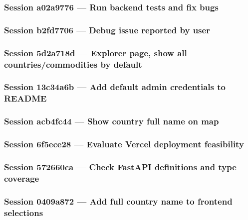 \subsubsection*{Session a02a9776 — Run backend tests and fix bugs}


\subsubsection*{Session b2fd7706 — Debug issue reported by user}


\subsubsection*{Session 5d2a718d — Explorer page, show all countries/commodities by default}


\subsubsection*{Session 13c34a6b — Add default admin credentials to README}


\subsubsection*{Session acb4fc44 — Show country full name on map}


\subsubsection*{Session 6f5ece28 — Evaluate Vercel deployment feasibility}


\subsubsection*{Session 572660ca — Check FastAPI definitions and type coverage}


\subsubsection*{Session 0409a872 — Add full country name to frontend selections}


